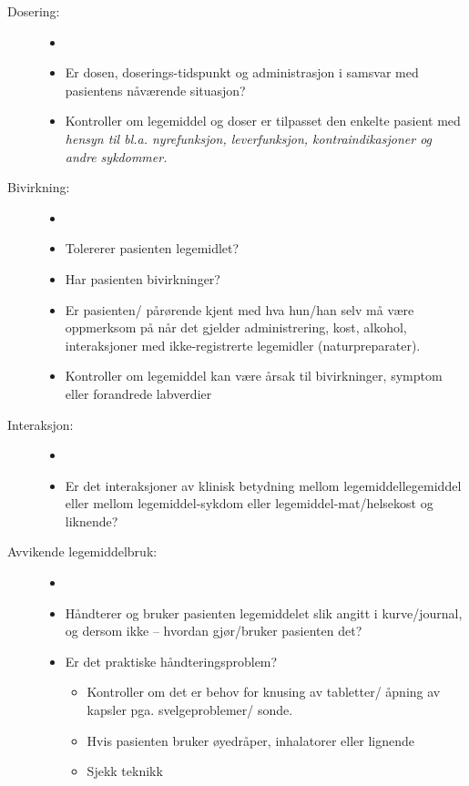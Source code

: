 \begin{enumerate}
\begin{description}
\item[Dosering:]
\begin{itemize}
\item[]
\item Er dosen, doserings-tidspunkt og administrasjon i samsvar med pasientens nåværende situasjon?
\item Kontroller om legemiddel og doser er tilpasset den enkelte pasient med \textit{hensyn til bl.a. nyrefunksjon, leverfunksjon, kontraindikasjoner og andre sykdommer.}
\end{itemize}

\item[Bivirkning:]
\begin{itemize}
\item[]
\item Tolererer pasienten legemidlet? 
\item Har pasienten bivirkninger?
\item Er pasienten/ pårørende kjent med hva hun/han selv må være oppmerksom på når det gjelder administrering, kost, alkohol, interaksjoner med ikke-registrerte legemidler (naturpreparater).
\item Kontroller om legemiddel kan være årsak til bivirkninger, symptom eller forandrede labverdier
\end{itemize}

\item[Interaksjon:]
\begin{itemize}
\item[]
\item Er det interaksjoner av klinisk betydning mellom legemiddellegemiddel eller mellom legemiddel-sykdom eller legemiddel-mat/helsekost og liknende?
\end{itemize}

\item[Avvikende legemiddelbruk:]
\begin{itemize}
\item[]
\item Håndterer og bruker pasienten legemiddelet slik angitt i kurve/journal, og dersom ikke – hvordan gjør/bruker pasienten det? 
\item Er det praktiske håndteringsproblem? 
\small
\begin{itemize}
\item Kontroller om det er behov for knusing av tabletter/ åpning av kapsler pga. svelgeproblemer/ sonde.
\item Hvis pasienten bruker øyedråper, inhalatorer eller lignende 
\item Sjekk teknikk
\end{itemize}
\end{itemize}


\end{description}
\end{enumerate}
